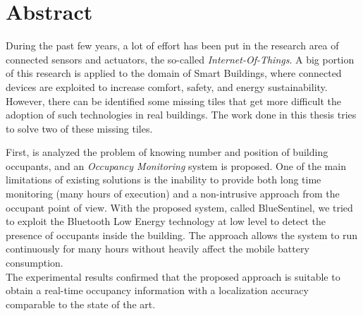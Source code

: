 %
%
\cleardoublepage
%
%
%
\begingroup
\let\cleardoublepage\relax
\let\cleardoublepage\relax
%
\chapter*{Abstract}
%
During the past few years, a lot of effort has been put in the research area of connected sensors and actuators, the so-called \emph{Internet-Of-Things}. A big portion of this research is applied to the domain of Smart Buildings, where connected devices are exploited to increase comfort, safety, and energy sustainability.
However, there can be identified some missing tiles that get more difficult the adoption of such technologies in real buildings.
The work done in this thesis tries to solve two of these missing tiles.

First, is analyzed the problem of knowing number and position of building occupants, and an \emph{Occupancy Monitoring} system is proposed. One of the main limitations of existing solutions is the inability to provide both long time monitoring (many hours of execution) and a non-intrusive approach from the occupant point of view.
With the proposed system, called BlueSentinel, we tried to exploit the Bluetooth Low Energy technology at low level to detect the presence of occupants inside the building. The approach allows the system to run continuously for many hours without heavily affect the mobile battery consumption.\\
The experimental results confirmed that the proposed approach is suitable to obtain a real-time occupancy information with a localization accuracy comparable to the state of the art.

